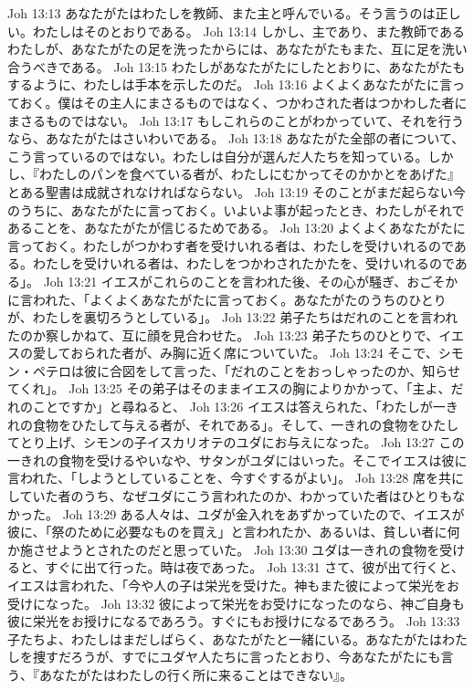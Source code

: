 Joh 13:13  あなたがたはわたしを教師、また主と呼んでいる。そう言うのは正しい。わたしはそのとおりである。
Joh 13:14  しかし、主であり、また教師であるわたしが、あなたがたの足を洗ったからには、あなたがたもまた、互に足を洗い合うべきである。
Joh 13:15  わたしがあなたがたにしたとおりに、あなたがたもするように、わたしは手本を示したのだ。
Joh 13:16  よくよくあなたがたに言っておく。僕はその主人にまさるものではなく、つかわされた者はつかわした者にまさるものではない。
Joh 13:17  もしこれらのことがわかっていて、それを行うなら、あなたがたはさいわいである。
Joh 13:18  あなたがた全部の者について、こう言っているのではない。わたしは自分が選んだ人たちを知っている。しかし、『わたしのパンを食べている者が、わたしにむかってそのかかとをあげた』とある聖書は成就されなければならない。
Joh 13:19  そのことがまだ起らない今のうちに、あなたがたに言っておく。いよいよ事が起ったとき、わたしがそれであることを、あなたがたが信じるためである。
Joh 13:20  よくよくあなたがたに言っておく。わたしがつかわす者を受けいれる者は、わたしを受けいれるのである。わたしを受けいれる者は、わたしをつかわされたかたを、受けいれるのである」。
Joh 13:21  イエスがこれらのことを言われた後、その心が騒ぎ、おごそかに言われた、「よくよくあなたがたに言っておく。あなたがたのうちのひとりが、わたしを裏切ろうとしている」。
Joh 13:22  弟子たちはだれのことを言われたのか察しかねて、互に顔を見合わせた。
Joh 13:23  弟子たちのひとりで、イエスの愛しておられた者が、み胸に近く席についていた。
Joh 13:24  そこで、シモン・ペテロは彼に合図をして言った、「だれのことをおっしゃったのか、知らせてくれ」。
Joh 13:25  その弟子はそのままイエスの胸によりかかって、「主よ、だれのことですか」と尋ねると、
Joh 13:26  イエスは答えられた、「わたしが一きれの食物をひたして与える者が、それである」。そして、一きれの食物をひたしてとり上げ、シモンの子イスカリオテのユダにお与えになった。
Joh 13:27  この一きれの食物を受けるやいなや、サタンがユダにはいった。そこでイエスは彼に言われた、「しようとしていることを、今すぐするがよい」。
Joh 13:28  席を共にしていた者のうち、なぜユダにこう言われたのか、わかっていた者はひとりもなかった。
Joh 13:29  ある人々は、ユダが金入れをあずかっていたので、イエスが彼に、「祭のために必要なものを買え」と言われたか、あるいは、貧しい者に何か施させようとされたのだと思っていた。
Joh 13:30  ユダは一きれの食物を受けると、すぐに出て行った。時は夜であった。
Joh 13:31  さて、彼が出て行くと、イエスは言われた、「今や人の子は栄光を受けた。神もまた彼によって栄光をお受けになった。
Joh 13:32  彼によって栄光をお受けになったのなら、神ご自身も彼に栄光をお授けになるであろう。すぐにもお授けになるであろう。
Joh 13:33  子たちよ、わたしはまだしばらく、あなたがたと一緒にいる。あなたがたはわたしを捜すだろうが、すでにユダヤ人たちに言ったとおり、今あなたがたにも言う、『あなたがたはわたしの行く所に来ることはできない』。

